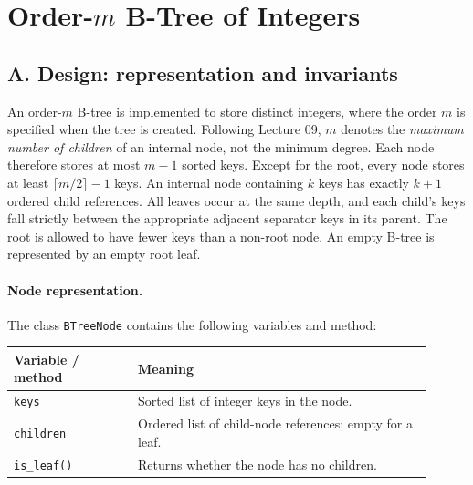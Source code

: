\documentclass{cisXXX}
\date{}
\begin{document}
\maketitle
\section*{Order-$m$ B-Tree of Integers}

\subsection*{A. Design: representation and invariants}
An order-$m$ B-tree is implemented to store distinct integers, where the order
$m$ is specified when the tree is created. Following Lecture 09, $m$ denotes
the \emph{maximum number of children} of an internal node, not the minimum
degree. Each node therefore stores at most $m-1$ sorted keys. Except for the
root, every node stores at least $\lceil m/2\rceil-1$ keys. An internal node
containing $k$ keys has exactly $k+1$ ordered child references. All leaves
occur at the same depth, and each child's keys fall strictly between the
appropriate adjacent separator keys in its parent. The root is allowed to have
fewer keys than a non-root node. An empty B-tree is represented by an empty
root leaf.

\paragraph{Node representation.}
The class \texttt{BTreeNode} contains the following variables and method:
\begin{center}
\begin{tabular}{@{}p{0.27\linewidth}p{0.64\linewidth}@{}}
\toprule
Variable / method & Meaning \\
\midrule
\texttt{keys} & Sorted list of integer keys in the node.\\
\texttt{children} & Ordered list of child-node references; empty for a leaf.\\
\texttt{is\_leaf()} & Returns whether the node has no children.\\
\bottomrule
\end{tabular}
\end{center}
\end{document}
